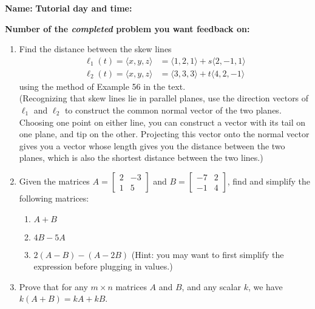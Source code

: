 \documentclass[12pt]{article}
\newcommand{\bbm}{\begin{bmatrix}}
\newcommand{\ebm}{\end{bmatrix}}
\begin{document}
{\bf \large Name:} \hspace{2.5in} {\bf Tutorial day and time:}

\bigskip

{\bf Number of the {\em completed} problem you want feedback on:}

\bigskip


\thispagestyle{fancy}
 \begin{enumerate}
 
\item Find the distance between the skew lines 
\begin{align*}
 \ell_1(t) = \langle x,y,z\rangle & = \langle 1,2,1\rangle+s\langle 2,-1,1\rangle\\
 \ell_2(t) = \langle x,y,z\rangle & = \langle 3,3,3\rangle+t\langle 4,2,-1\rangle
\end{align*}
using the method of Example 56 in the text. \\
(Recognizing that skew lines lie in parallel planes, use the direction vectors of $\ell_1$ and $\ell_2$ to construct the common normal vector of the two planes. Choosing one point on either line, you can construct a vector with its tail on one plane, and tip on the other. Projecting this vector onto the normal vector gives you a vector whose length gives you the distance between the two planes, which is also the shortest distance between the two lines.)

\newpage

\item Given the matrices $A = \bbm 2&-3\\1&5\ebm$ and $B = \bbm -7 & 2\\-1&4\ebm$, find and simplify the following matrices:
\begin{enumerate}
 \item $A+B$

\vspace{1in}


 \item $4B-5A$

\vspace{1.5in}

 \item $2(A-B)-(A-2B)$ (Hint: you may want to first simplify the expression before plugging in values.)
\end{enumerate}

\vspace{1.5in}

 \item Prove that for any $m\times n$ matrices $A$ and $B$, and any scalar $k$, we have $k(A+B)=kA+kB$.
 \end{enumerate}
\end{document}
